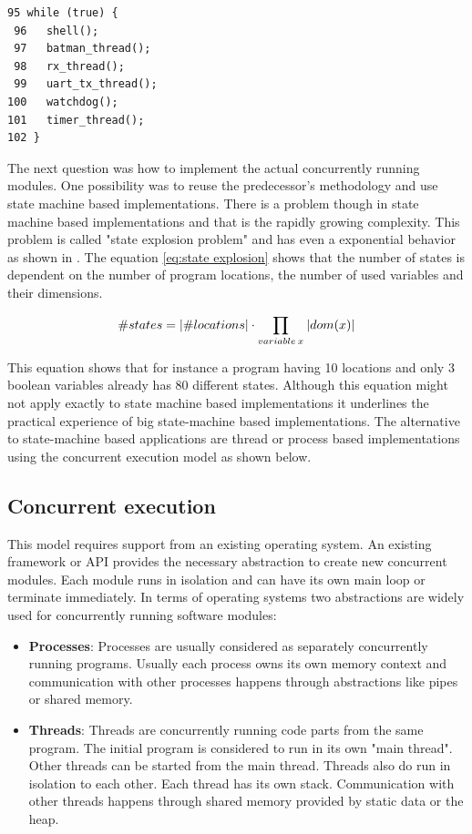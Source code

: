 \begin{lstlisting}[label=lst:urbaniak_main,caption=main function implementation]
 95 while (true) {
 96   shell();
 97   batman_thread();
 98   rx_thread();
 99   uart_tx_thread();
100   watchdog();
101   timer_thread();
102 }
\end{lstlisting}

The next question was how to implement the actual concurrently running modules. One possibility was to reuse the predecessor's methodology and use state machine based implementations. There is a problem though in state machine based implementations and that is the rapidly growing complexity. This problem is called "state explosion problem" and has even a exponential behavior as shown in \cite{katoen}. The equation \ref{eq:state explosion} shows that the number of states is dependent on the number of program locations, the number of used variables and their dimensions.

\begin{equation}
\label{eq:state explosion}
\#states = \lvert\#locations\rvert \cdot \prod_{variable \: x} \: \lvert dom(x)\rvert
\end{equation}

This equation shows that for instance a program having 10 locations and only 3 boolean variables already has 80 different states. Although this equation might not apply exactly to state machine based implementations it underlines the practical experience of big state-machine based implementations. The alternative to state-machine based applications are thread or process based implementations using the concurrent execution model as shown below.

\subsection{Concurrent execution}%
This model requires support from an existing operating system. An existing framework or API provides the necessary abstraction to create new concurrent modules. Each module runs in isolation and can have its own main loop or terminate immediately. In terms of operating systems two abstractions are widely used for concurrently running software modules:

\begin{itemize}
    \item \textbf{Processes}: Processes are usually considered as separately concurrently running programs. Usually each process owns its own memory context and communication with other processes happens through abstractions like pipes or shared memory.
    \item \textbf{Threads}: Threads are concurrently running code parts from the same program. The initial program is considered to run in its own "main thread". Other threads can be started from the main thread. Threads also do run in isolation to each other. Each thread has its own stack. Communication with other threads happens through shared memory provided by static data or the heap.
\end{itemize}

